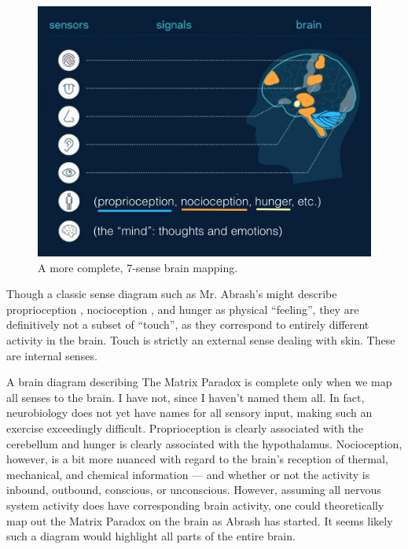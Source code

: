 \documentclass{article}
\begin{document}
\begin{figure}[h]
  \centering
  \includegraphics[width=\linewidth]{images/michael-abrash-senses-extended-attached.jpeg}
  \caption{A more complete, 7-sense brain mapping.}
  \label{fig:michael-abrash-senses-extended}
\end{figure}

Though a classic sense diagram such as Mr. Abrash's might describe proprioception \cite{ramachandranbrainfunction, proprioception}, nocioception \cite{nocioception}, and hunger \cite{fmrihunger} as physical ``feeling'', they are definitively not a subset of ``touch'', as they correspond to entirely different activity in the brain. Touch is strictly an external sense dealing with skin. These are internal senses.

A brain diagram describing The Matrix Paradox is complete only when we map all senses to the brain. I have not, since I haven't named them all. In fact, neurobiology does not yet have names for all sensory input, making such an exercise exceedingly difficult. Proprioception is clearly associated with the cerebellum and hunger is clearly associated with the hypothalamus. Nocioception, however, is a bit more nuanced with regard to the brain's reception of thermal, mechanical, and chemical information — and whether or not the activity is inbound, outbound, conscious, or unconscious. However, assuming all nervous system activity does have corresponding brain activity, one could theoretically map out the Matrix Paradox on the brain as Abrash has started. It seems likely such a diagram would highlight all parts of the entire brain.
\end{document}
